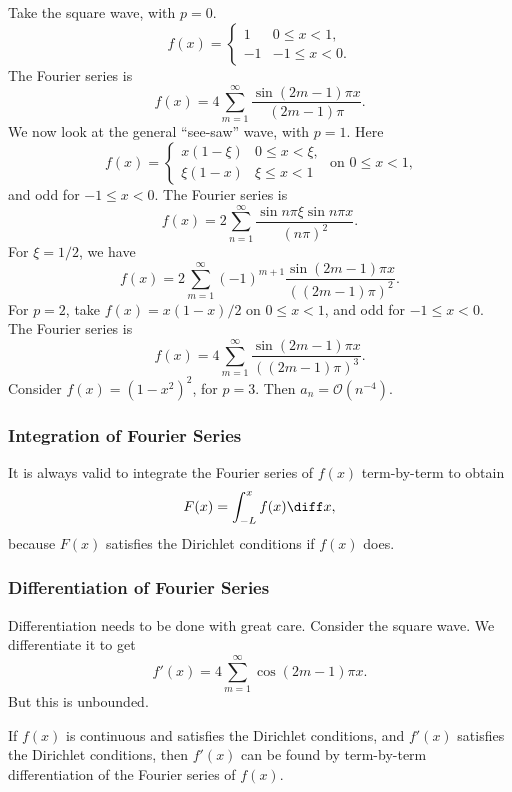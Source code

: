 \documentclass[12pt]{article}
\begin{document}
\begin{exbox}
	Take the square wave, with $p = 0$.
	\[
		f(x) =
		\begin{cases}
			1 & 0 \leq x < 1, \\
			-1 & -1 \leq x < 0.
		\end{cases}
	\]
	The Fourier series is
	\[
		f(x) = 4 \sum_{m = 1}^{\infty} \frac{\sin (2m - 1) \pi x}{(2m - 1)\pi}
	.\]
	We now look at the general ``see-saw'' wave, with $p = 1$. Here
	\[
		f(x) =
		\begin{cases}
			x(1 - \xi) & 0 \leq x < \xi, \\
			\xi(1 - x) & \xi \leq x < 1
		\end{cases}
		\text{ on } 0 \leq x < 1,
	\]
	and odd for $-1 \leq x < 0$. The Fourier series is
	\[
		f(x) = 2 \sum_{n = 1}^{\infty} \frac{\sin n \pi \xi \sin n \pi x}{(n \pi)^2}
	.\]
	For $\xi = 1/2$, we have
	\[
		f(x) = 2 \sum_{m = 1}^{\infty}(-1)^{m+1} \frac{\sin (2m - 1) \pi x}{((2m - 1)\pi)^2}
	.\]
	For $p = 2$, take $f(x) = x(1-x)/2$ on $0 \leq x < 1$, and odd for $-1 \leq x < 0$. The Fourier series is
	\[
		f(x) = 4 \sum_{m = 1}^{\infty} \frac{\sin (2m - 1) \pi x}{((2m - 1)\pi)^3}
	.\]
	Consider $f(x) = (1 - x^2)^2$, for $p = 3$. Then $a_n = \mathcal{O}(n^{-4})$.
\end{exbox}

\subsubsection{Integration of Fourier Series}%
\label{subsub:integration_of_fourier_series}

It is always valid to integrate the Fourier series of $f(x)$ term-by-term to obtain
\[
	F(x) = \int_{-L}^{x} f(x)\diff x
,\]
because $F(x)$ satisfies the Dirichlet conditions if $f(x)$ does.

\subsubsection{Differentiation of Fourier Series}%
\label{subsub:differentiation_of_fourier_series}

Differentiation needs to be done with great care. Consider the square wave. We differentiate it to get
\[
	f'(x) = 4 \sum_{m = 1}^{\infty} \cos (2m - 1) \pi x
.\]
But this is unbounded.

\begin{theorem}
	If $f(x)$ is continuous and satisfies the Dirichlet conditions, and $f'(x)$ satisfies the Dirichlet conditions, then $f'(x)$ can be found by term-by-term differentiation of the Fourier series of $f(x)$.
\end{theorem}
\end{document}
